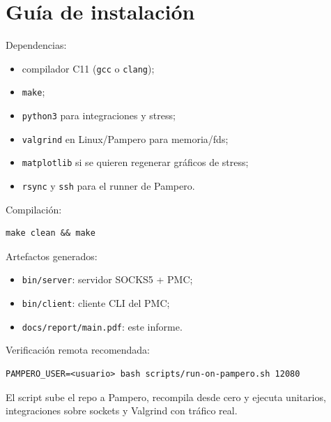 \section{Guía de instalación}

Dependencias:
\begin{itemize}[nosep]
  \item compilador C11 (\texttt{gcc} o \texttt{clang});
  \item \texttt{make};
  \item \texttt{python3} para integraciones y stress;
  \item \texttt{valgrind} en Linux/Pampero para memoria/fds;
  \item \texttt{matplotlib} si se quieren regenerar gráficos de stress;
  \item \texttt{rsync} y \texttt{ssh} para el runner de Pampero.
\end{itemize}

Compilación:
\begin{verbatim}
make clean && make
\end{verbatim}

Artefactos generados:
\begin{itemize}[nosep]
  \item \texttt{bin/server}: servidor SOCKS5 + PMC;
  \item \texttt{bin/client}: cliente CLI del PMC;
  \item \texttt{docs/report/main.pdf}: este informe.
\end{itemize}

Verificación remota recomendada:
\begin{verbatim}
PAMPERO_USER=<usuario> bash scripts/run-on-pampero.sh 12080
\end{verbatim}

El script sube el repo a Pampero, recompila desde cero y ejecuta unitarios,
integraciones sobre sockets y Valgrind con tráfico real.
